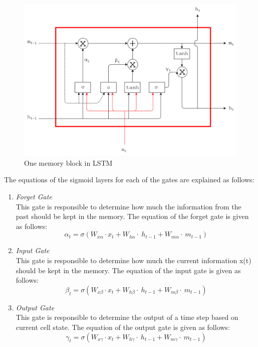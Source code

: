 \begin{figure}
	\centering
	\includegraphics[width=1.0\linewidth]{images/lstm}
	\caption{One memory block in LSTM}
	\label{fig:lstm}
\end{figure}

The equations of the sigmoid layers for each of the gates are explained as follows:
\begin{enumerate}
	\item \textit{Forget Gate}\\
	This gate is responsible to determine how much the information from the past should be kept in the memory. The equation of the forget gate is given as follows:
	\begin{equation}\label{eq:forget_lstm}
	\alpha_{t}=\sigma(W_{x\alpha}\cdot x_{t}+W_{h\alpha}\cdot~h_{t-1}+W_{m\alpha}\cdot~m_{t-1})
	\end{equation}
	
	\item \textit{Input Gate}\\
	This gate is responsible to determine how much the current information x(t) should be kept in the memory. The equation of the input gate is given as follows:
	\begin{equation}\label{eq:input_lstm}
	\beta_{t}=\sigma(W_{x\beta}\cdot x_{t}+W_{h\beta}\cdot~h_{t-1}+W_{m\beta}\cdot~m_{t-1})
	\end{equation}
	
	\item \textit{Output Gate}\\
	This gate is responsible to determine the output of a time step based on current cell state. The equation of the output gate is given as follows:
	\begin{equation}\label{eq:output_lstm}
	\gamma_{t}=\sigma(W_{x\gamma}\cdot x_{t}+W_{h\gamma}\cdot~h_{t-1}+W_{m\gamma}\cdot~m_{t-1})
	\end{equation}
	
\end{enumerate}

